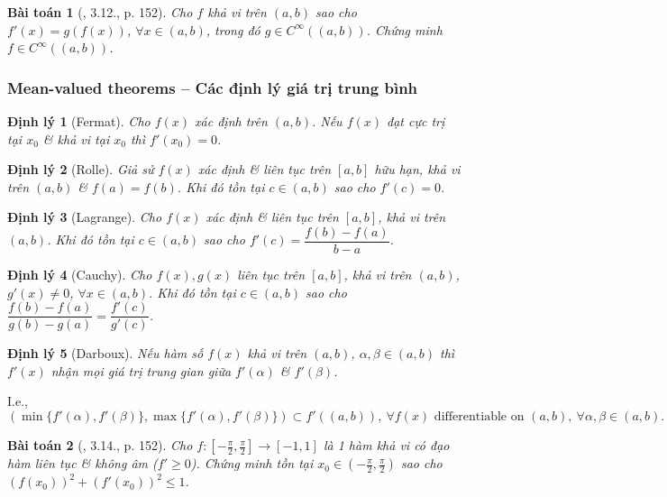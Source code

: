 \documentclass{article}
\newtheorem{baitoan}{Bài toán}
\newtheorem{dinhly}{Định lý}
\begin{document}
\begin{baitoan}[\cite{Quoc_Long_Dat_Nam_VMC}, 3.12., p. 152]
	Cho $f$ khả vi trên $(a,b)$ sao cho $f'(x) = g(f(x))$, $\forall x\in(a,b)$, trong đó $g\in C^\infty((a,b))$. Chứng minh $f\in C^\infty((a,b))$.
\end{baitoan}


\subsubsection{Mean-valued theorems -- Các định lý giá trị trung bình}

\begin{dinhly}[Fermat]
	Cho $f(x)$ xác định trên $(a,b)$. Nếu $f(x)$ đạt cực trị tại $x_0$ \& khả vi tại $x_0$ thì $f'(x_0) = 0$.
\end{dinhly}

\begin{dinhly}[Rolle]
	Giả sử $f(x)$ xác định \& liên tục trên $[a,b]$ hữu hạn, khả vi trên $(a,b)$ \& $f(a) = f(b)$. Khi đó tồn tại $c\in(a,b)$ sao cho $f'(c) = 0$.
\end{dinhly}

\begin{dinhly}[Lagrange]
	Cho $f(x)$ xác định \& liên tục trên $[a,b]$, khả vi trên $(a,b)$. Khi đó tồn tại $c\in(a,b)$ sao cho $f'(c) = \dfrac{f(b) - f(a)}{b - a}$.
\end{dinhly}

\begin{dinhly}[Cauchy]
	Cho $f(x),g(x)$ liên tục trên $[a,b]$, khả vi trên $(a,b)$, $g'(x)\ne0$, $\forall x\in(a,b)$. Khi đó tồn tại $c\in(a,b)$ sao cho $\dfrac{f(b) - f(a)}{g(b) - g(a)} = \dfrac{f'(c)}{g'(c)}$.
\end{dinhly}

\begin{dinhly}[Darboux]
	Nếu hàm số $f(x)$ khả vi trên $(a,b)$, $\alpha,\beta\in(a,b)$ thì $f'(x)$ nhận mọi giá trị trung gian giữa $f'(\alpha)$ \& $f'(\beta)$.
\end{dinhly}
I.e.,
\begin{equation*}
	(\min\{f'(\alpha),f'(\beta)\},\max\{f'(\alpha),f'(\beta)\})\subset f'((a,b)),\ \forall f(x)\mbox{ differentiable on }(a,b),\ \forall\alpha,\beta\in(a,b).
\end{equation*}

\begin{baitoan}[\cite{Quoc_Long_Dat_Nam_VMC}, 3.14., p. 152]
	Cho $f:\left[-\frac{\pi}{2},\frac{\pi}{2}\right]\to[-1,1]$ là 1 hàm khả vi có đạo hàm liên tục \& không âm ($f'\ge0$). Chứng minh tồn tại $x_0\in\left(-\frac{\pi}{2},\frac{\pi}{2}\right)$ sao cho $(f(x_0))^2 + (f'(x_0))^2\le1$.
\end{baitoan}
\end{document}
